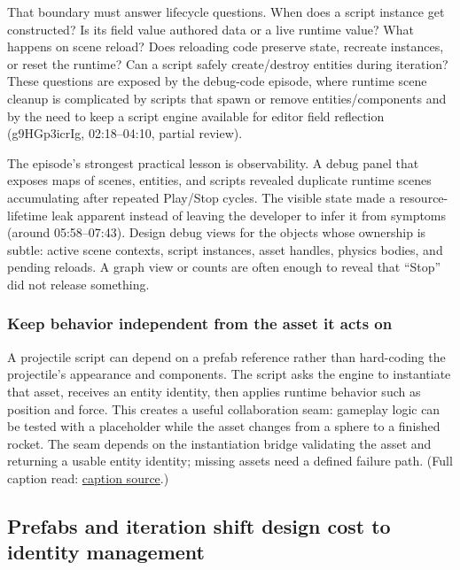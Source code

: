 That boundary must answer lifecycle questions. When does a script instance get constructed? Is its field value authored data or a live runtime value? What happens on scene reload? Does reloading code preserve state, recreate instances, or reset the runtime? Can a script safely create/destroy entities during iteration? These questions are exposed by the debug-code episode, where runtime scene cleanup is complicated by scripts that spawn or remove entities/components and by the need to keep a script engine available for editor field reflection (g9HGp3icrIg, 02:18--04:10, partial review).

The episode's strongest practical lesson is observability. A debug panel that exposes maps of scenes, entities, and scripts revealed duplicate runtime scenes accumulating after repeated Play/Stop cycles. The visible state made a resource-lifetime leak apparent instead of leaving the developer to infer it from symptoms (around 05:58--07:43). Design debug views for the objects whose ownership is subtle: active scene contexts, script instances, asset handles, physics bodies, and pending reloads. A graph view or counts are often enough to reveal that ``Stop'' did not release something.

\subsubsection{Keep behavior independent from the asset it acts on}\label{06-engine-ii-ch033-keep-behavior-independent-from-the-asset-it-acts-on}

\hypertarget{06-engine-ii-ch033-keep-behavior-independent-from-the-asset-it-acts-on}{}

A projectile script can depend on a prefab reference rather than hard-coding the projectile's appearance and components. The script asks the engine to instantiate that asset, receives an entity identity, then applies runtime behavior such as position and force. This creates a useful collaboration seam: gameplay logic can be tested with a placeholder while the asset changes from a sphere to a finished rocket. The seam depends on the instantiation bridge validating the asset and returning a usable entity identity; missing assets need a defined failure path. (Full caption read: \href{https://www.youtube.com/watch?v=ogQTYSokqAI}{caption source}.)

\subsection{Prefabs and iteration shift design cost to identity management}\label{06-engine-ii-ch033-prefabs-and-iteration-shift-design-cost-to-identity-management}

